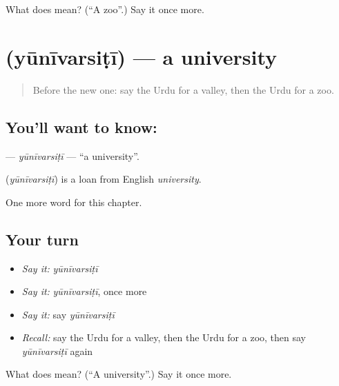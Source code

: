\begin{tcolorbox}[breakable,colback=teal!4,colframe=teal!35!black,title={Before you move on}]
What does   mean? (\textquotedblleft{}A zoo\textquotedblright{}.) Say it once more.
\end{tcolorbox}
\section[\texorpdfstring{\ur{یونیورسٹی} (yūnīvarsiṭī)}{یونیورسٹی (yūnīvarsiṭī)}]{ (yūnīvarsiṭī) — a university}

\label{lesson:UR-C190-yunivarsiti}



\begin{quote}
Before the new one: say the Urdu for a valley, then the Urdu for a zoo.
\end{quote}

\subsection*{You'll want to know: }
\textbf{} — \emph{yūnīvarsiṭī} — \textquotedblleft{}a university\textquotedblright{}.

\begin{cousinweb}
\textbf{} (\emph{yūnīvarsiṭī}) is a loan from English \emph{university}.
\end{cousinweb}

\begin{grammarlens}[title={What you've built}]
One more word for this chapter.
\end{grammarlens}

\subsection*{Your turn}
\begin{itemize}
\raggedright
  \item \emph{Say it:} \emph{yūnīvarsiṭī}
  \item \emph{Say it:} \emph{yūnīvarsiṭī}, once more
  \item \emph{Say it:} say \emph{yūnīvarsiṭī}
  \item \emph{Recall:} say the Urdu for a valley, then the Urdu for a zoo, then say \emph{yūnīvarsiṭī} again
\end{itemize}

\begin{tcolorbox}[breakable,colback=teal!4,colframe=teal!35!black,title={Before you move on}]
What does  mean? (\textquotedblleft{}A university\textquotedblright{}.) Say it once more.
\end{tcolorbox}
